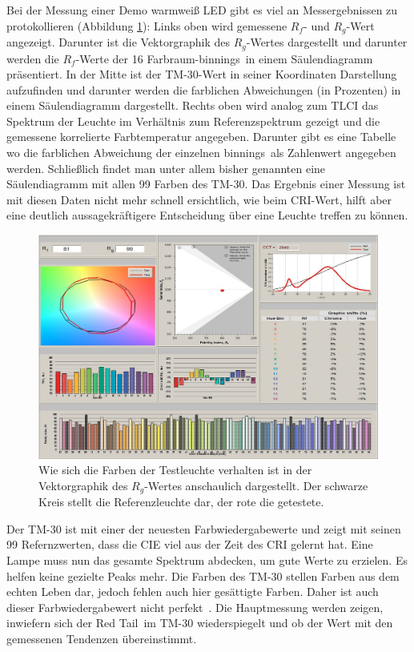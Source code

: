 Bei der Messung einer Demo warmweiß LED gibt es viel an Messergebnissen zu protokollieren (Abbildung \ref{b_tm304}): Links oben wird gemessene $R_{f}$- und $R_{g}$-Wert angezeigt. Darunter ist die Vektorgraphik des $R_{g}$-Wertes dargestellt und darunter werden die $R_{f}$-Werte der 16 Farbraum-\glqq binnings\grqq\  in einem Säulendiagramm präsentiert. In der Mitte ist der TM-30-Wert in seiner Koordinaten Darstellung aufzufinden und darunter werden die farblichen Abweichungen (in Prozenten) in einem Säulendiagramm dargestellt. Rechts oben wird analog zum TLCI das Spektrum der Leuchte im Verhältnis zum Referenzspektrum gezeigt und die gemessene korrelierte Farbtemperatur angegeben. Darunter gibt es eine Tabelle wo die farblichen Abweichung der einzelnen \glqq binnings\grqq\ als Zahlenwert angegeben werden. Schließlich findet man unter allem bisher genannten eine Säulendiagramm mit allen 99 Farben des TM-30. 
Das Ergebnis einer Messung ist mit diesen Daten nicht mehr schnell ersichtlich, wie beim CRI-Wert, hilft aber eine deutlich aussagekräftigere Entscheidung über eine Leuchte treffen zu können. 

\begin{figure}[H]     %
\centering
\includegraphics[width=1.0\textwidth]{bilder/tm304} 
\caption {Wie sich die Farben der Testleuchte verhalten ist in der Vektorgraphik des $R_{g}$-Wertes anschaulich dargestellt. Der schwarze Kreis stellt die Referenzleuchte dar, der rote die getestete.\protect\footnotemark}\label{b_tm304}
\end{figure}

Der TM-30 ist mit einer der neuesten Farbwiedergabewerte und zeigt mit seinen 99 Refernzwerten, dass die CIE viel aus der Zeit des CRI gelernt hat. Eine Lampe muss nun das gesamte Spektrum abdecken, um gute Werte zu erzielen. Es helfen keine gezielte Peaks mehr. Die Farben des TM-30 stellen Farben aus dem echten Leben dar, jedoch fehlen auch hier gesättigte Farben. Daher ist auch dieser Farbwiedergabewert nicht \glqq perfekt\grqq\ . Die Hauptmessung werden zeigen, inwiefern sich der \glqq Red Tail\grqq\ im TM-30 wiederspiegelt und ob der Wert mit den gemessenen Tendenzen übereinstimmt.

